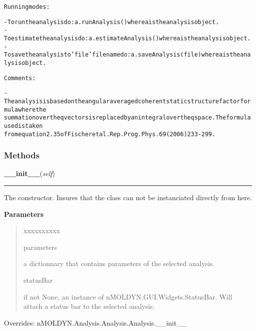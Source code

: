 \begin{alltt}
Running modes:

    - To run the analysis do: a.runAnalysis() where a is the analysis object.
    - To estimate the analysis do: a.estimateAnalysis() where a is the analysis object.
    - To save the analysis to 'file' file name do: a.saveAnalysis(file) where a is the analysis object.
    
Comments:
    
    - The analysis is based on the angular averaged coherent static structure factor formula where the
      summation over the q vectors is replaced by an integral over the q space. The formula used is taken 
      from equation 2.35 of Fischer et al. Rep. Prog. Phys. 69 (2006) 233-299.
    
\end{alltt}



  \subsubsection{Methods}

    \vspace{0.5ex}

\hspace{.8\funcindent}\begin{boxedminipage}{\funcwidth}

    \raggedright \textbf{\_\_init\_\_}(\textit{self})

    \vspace{-1.5ex}

    \rule{\textwidth}{0.5\fboxrule}
\setlength{\parskip}{2ex}
    The constructor. Insures that the class can not be instanciated 
    directly from here.

\setlength{\parskip}{1ex}
      \textbf{Parameters}
      \vspace{-1ex}

      \begin{quote}
        \begin{Ventry}{xxxxxxxxxx}

          \item[parameters]

          a dictionnary that contains parameters of the selected analysis.

          \item[statusBar]

          if not None, an instance of nMOLDYN.GUI.Widgets.StatusBar. Will 
          attach a status bar to the selected analysis.

        \end{Ventry}

      \end{quote}

      Overrides: nMOLDYN.Analysis.Analysis.Analysis.\_\_init\_\_

    \end{boxedminipage}

